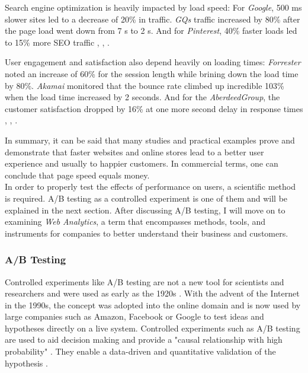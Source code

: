 Search engine optimization is heavily impacted by load speed:
For \textit{Google}, 500 ms slower sites led to a decrease of 20\% in traffic.
\textit{GQs} traffic increased by 80\% after the page load went down from 7 s to 2 s.
And for \textit{Pinterest}, 40\% faster loads led to 15\% more SEO traffic \cite{2015GQ}, \cite{2006Mayer}, \cite{2017Pinterest}.


User engagement and satisfaction also depend heavily on loading times:
\textit{Forrester} noted an increase of 60\% for the session length while brining down the load time by 80\%.
\textit{Akamai} monitored that the bounce rate climbed up incredible 103\% when the load time increased by 2 seconds.
And for the \textit{AberdeedGroup}, the customer satisfaction dropped by 16\% at one more second delay in response times \cite{2017Forrester}, \cite{2017Akamai}, \cite{2008Aberdeen}.

In summary, it can be said that many studies and practical examples prove and demonstrate that faster websites and online stores lead to a better user experience and usually to happier customers.
In commercial terms, one can conclude that page speed equals money.
\\

In order to properly test the effects of performance on users, a scientific method is required.
A/B testing as a controlled experiment is one of them and will be explained in the next section.
After discussing A/B testing, I will move on to examining \textit{Web Analytics}, a term that encompasses methods, tools, and instruments for companies to better understand their business and customers.


\subsubsection{A/B Testing}

Controlled experiments like A/B testing are not a new tool for scientists and researchers and were used as early as the 1920s \cite{2016Kohavi}.
With the advent of the Internet in the 1990s, the concept was adopted into the online domain and is now used by large companies such as Amazon, Facebook or Google to test ideas and hypotheses directly on a live system.
Controlled experiments such as A/B testing are used to aid decision making and provide a "causal relationship with high probability" \cite{2016Kohavi}.
They enable a data-driven and quantitative validation of the hypothesis \cite{2018Morys}.

